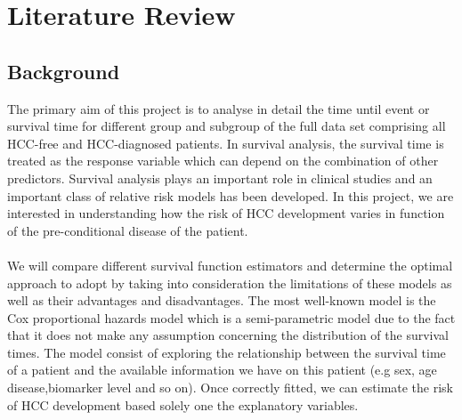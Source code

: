 \documentclass[11pt,twoside]{article}
\numberwithin{Theorem}{section}
\numberwithin{Definition}{section}
\numberwithin{Lemma}{section}
\numberwithin{Algorithm}{section}
\numberwithin{equation}{section}
\begin{document}
\section{Literature Review}
\subsection{Background}
\label{sec:background}
The primary aim of this project is to analyse in detail the time until event or survival time for different group and subgroup of the full data set comprising all HCC-free and HCC-diagnosed patients. In survival analysis, the survival time is treated as the response variable which can depend on the combination of other predictors. Survival analysis plays an important role in clinical studies and an important class of relative risk models has been developed. In this project, we are interested in understanding how the risk of HCC development varies in function of the pre-conditional disease of the patient.
\\ \\
We will compare different survival function estimators and determine the optimal approach to adopt by taking into consideration the limitations of these models as well as their advantages and disadvantages.
The most well-known model is the Cox proportional hazards model \cite{cox1992regression} which is a semi-parametric model due to the fact that it does not make any assumption concerning the distribution of the survival times. The model consist of exploring the relationship between the survival time of a patient and the available information we have on this patient (e.g sex, age disease,biomarker level and so on). Once correctly fitted, we can estimate the risk of HCC development based solely one the explanatory variables.
%
%
%
%
%
%
%
%
%
%
%
\end{document}
